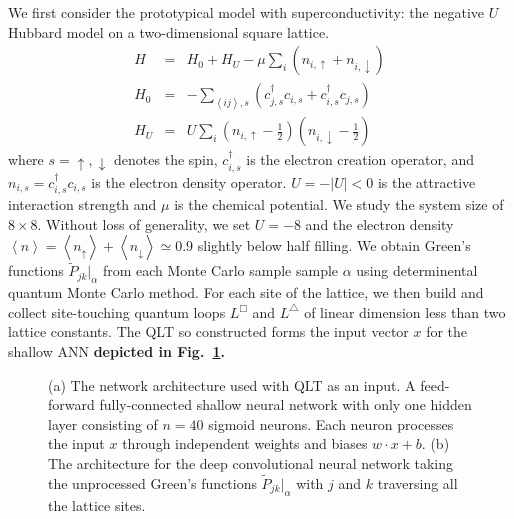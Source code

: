 \documentclass[amsmath,amssymb, aps, prl, twocolumn]{revtex4-1}
\begin{document}
We first consider the prototypical model with superconductivity: the negative $U$ Hubbard model on a two-dimensional square lattice\cite{Scalettar1989, Scalapino1992}. 
\begin{eqnarray}
H &=& H_0 + H_U -  \mu\underset{i}{\sum} \left(n_{i,\uparrow} +n_{i,\downarrow}\right) \nonumber\\
H_0 &=& -\underset{\left\langle ij \right\rangle, s}{\sum} \left( c^\dagger_{j,s}c_{i,s} +  c^\dagger_{i,s}c_{j,s} \right) \nonumber \\
H_U &=& U \underset{i}{\sum} \left(n_{i,\uparrow}-\frac{1}{2}\right) \left(n_{i,\downarrow}-\frac{1}{2}\right)
\label{eq:hubbard}
\end{eqnarray}
where $s = \uparrow, \downarrow$ denotes the spin, $c^\dagger_{i,s}$ is the electron creation operator, and $n_{i,s}=c^\dagger_{i,s}c_{i,s}$ is the electron density operator. $U=-\left|U\right|<0$ is the attractive interaction strength and $\mu$ is the chemical potential. We study the system size of $8\times 8$. Without loss of generality, we set $U=-8$ and the electron density $\left\langle n\right\rangle = \left\langle n_\uparrow\right\rangle+ \left\langle n_\downarrow\right\rangle  \simeq 0.9$ slightly below half filling. We obtain Green's functions $\widetilde{P}_{jk}|_{\alpha}$ from each Monte Carlo sample sample $\alpha$ using determinental quantum Monte Carlo method. For each site of the lattice, we then build and collect site-touching quantum loops $L^\Box$ and $ L^\triangle$ of linear dimension less than two lattice constants. The QLT so constructed forms the input vector $x$ for the shallow ANN {\color{red} \bf depicted in Fig.~\ref{fig:network_architecture}.}  

\vskip 1cm


\begin{figure}
    \centering
    \caption{(a) The network architecture used with QLT as an input. A feed-forward fully-connected shallow neural network with only one hidden layer consisting of $n=40$ sigmoid neurons. Each neuron processes the input $x$ through independent weights and biases $w\cdot x+b$. 
    (b) The architecture for the deep convolutional neural network taking the unprocessed Green's functions $\widetilde{P}_{jk}|_{\alpha}$ with $j$ and $k$ traversing all the lattice sites.}
    \label{fig:network_architecture}
\end{figure}
\end{document}
